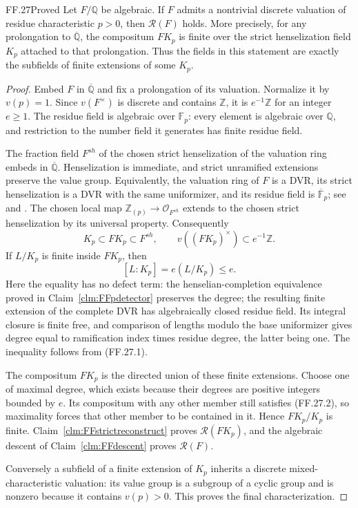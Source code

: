 \begin{claim}{FF.27}{Proved}\label{clm:FFdiscretealgebraic}
Let \(F/\mathbb Q\) be algebraic. If \(F\) admits a
nontrivial discrete valuation of residue characteristic
\(p>0\), then \(\mathcal R(F)\) holds. More precisely,
for any prolongation to \(\overline{\mathbb Q}\), the
compositum \(FK_p\) is finite over the strict
henselization field \(K_p\) attached to that prolongation.
Thus the fields in this statement are exactly the
subfields of finite extensions of some \(K_p\).
\end{claim}
\begin{proof}
Embed \(F\) in \(\overline{\mathbb Q}\) and fix a
prolongation of its valuation. Normalize it by
\(v(p)=1\). Since \(v(F^\times)\) is discrete and
contains \(\mathbb Z\), it is \(e^{-1}\mathbb Z\)
for an integer \(e\geq1\). The residue field is
algebraic over \(\mathbb F_p\): every element is
algebraic over \(\mathbb Q\), and restriction to
the number field it generates has finite residue field.

The fraction field \(F^{sh}\) of the chosen strict
henselization of the valuation ring embeds in
\(\overline{\mathbb Q}\). Henselization is immediate,
and strict unramified extensions preserve the value
group. Equivalently, the valuation ring of \(F\)
is a DVR, its strict henselization is a DVR with the
same uniformizer, and its residue field is
\(\overline{\mathbb F}_p\); see
\citep[Corollary~3.3.26]{FF_ADH2017} and
\citep[Tags 04GP, 0AP3]{FF_StacksHensel}.
The chosen local map \(\mathbb Z_{(p)}\to
\mathcal O_{F^{sh}}\) extends to the chosen strict
henselization by its universal property. Consequently
\[
 K_p\subset FK_p\subset F^{sh},
       \qquad v((FK_p)^\times)\subset e^{-1}\mathbb Z.
                                                        \tag{FF.27.1}
\]
If \(L/K_p\) is finite inside \(FK_p\), then
\[
 [L:K_p]=e(L/K_p)\leq e.                                \tag{FF.27.2}
\]
Here the equality has no defect term: the
henselian-completion equivalence proved in
Claim~\ref{clm:FFpdetector} preserves the degree;
the resulting finite extension of the complete DVR
has algebraically closed residue field. Its integral
closure is finite free, and comparison of lengths
modulo the base uniformizer gives degree equal to
ramification index times residue degree, the latter
being one. The inequality follows from (FF.27.1).

The compositum \(FK_p\) is the directed union of
these finite extensions. Choose one of maximal
degree, which exists because their degrees are
positive integers bounded by \(e\). Its compositum
with any other member still satisfies (FF.27.2),
so maximality forces that other member to be
contained in it. Hence \(FK_p/K_p\) is finite.
Claim~\ref{clm:FFstrictreconstruct} proves
\(\mathcal R(FK_p)\), and the algebraic descent
of Claim~\ref{clm:FFdescent} proves
\(\mathcal R(F)\).

Conversely a subfield of a finite extension of
\(K_p\) inherits a discrete mixed-characteristic
valuation: its value group is a subgroup of a
cyclic group and is nonzero because it contains
\(v(p)>0\). This proves the final characterization.
\end{proof}

